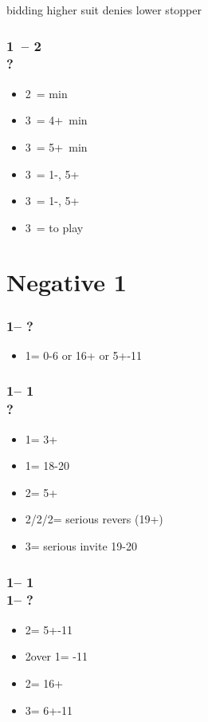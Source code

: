 \documentclass[12pt, a4paper]{report}
\begin{document}
{    bidding higher suit denies lower stopper

    \subsubsection*{1\diams\ -- 2\spades \\ ?}
    \begin{itemize}
        \item 2\nt\ = \bal min
        \item 3\clubs\ = 4+\clubs\ min
        \item 3\diams\ = 5+\diams\ min
        \item 3\hearts\ = 1-\hearts, 5+\diams\ \gf
        \item 3\spades\ = 1-\spades, 5+\diams\ \gf
        \item 3\nt\ = to play
    \end{itemize}
}

\section*{\colorbox{blue!30}{Negative 1\diams}}
 {

    \subsubsection*{1\clubs -- ?}
    \begin{itemize}
        \item 1\diams = 0-6 or 16+ \bal or 5+-11
    \end{itemize}

    \subsubsection*{1\clubs -- 1\diams\\
                    ?}
    \begin{itemize}
        \item 1\major = 3+
        \item 1\nt = 18-20 \bal
        \item 2\clubs = 5+\clubs
        \item 2\diams/2\hearts/2\spades = serious revers (19+)
        \item 3\clubs = serious invite 19-20
    \end{itemize}

    \subsubsection*{1\clubs -- 1\diams\\
                    1\major -- ?}
    \begin{itemize}
        \item 2\diams = 5+-11
        \item 2\spades over 1\hearts = -11
        \item 2\nt = 16+ \bal
        \item 3\minor = 6+-11
    \end{itemize}
}
\end{document}
